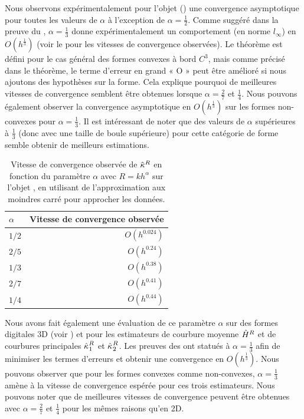 Nous observons expérimentalement pour l'objet \Ellipse
() une convergence asymptotique pour
toutes les valeurs de $\alpha$ à l'exception de $\alpha = \frac{1}{2}$. Comme
suggéré dans la preuve du , $\alpha =
\frac{1}{3}$ donne expérimentalement un comportement (en norme $l_\infty$) en
$O(h^\frac{1}{3})$ (voir le  pour les
vitesses de convergence observées). Le théorème est défini pour le cas général
des formes convexes à bord $C^3$, mais comme précisé dans le théorème, le terme
d'erreur en grand « O » peut être amélioré si nous ajoutons des hypothèses sur
la forme. Cela explique pourquoi de meilleures vitesses de convergence semblent
être obtenues lorsque $\alpha = \frac{2}{7}$ et $\frac{1}{4}$. Nous pouvons
également observer la convergence asymptotique en $O(h^\frac{1}{3})$ sur les
formes non-convexes pour $\alpha = \frac{1}{3}$. Il est intéressant de noter que
des valeurs de $\alpha$ supérieures à $\frac{1}{3}$ (donc avec une taille de
boule supérieure) pour cette catégorie de forme semble obtenir de meilleurs
estimations.
%
\begin{table}[ht]
\centering
%
\caption{Vitesse de convergence observée de $\hat{\kappa}^{R}$ en fonction du paramètre
$\alpha$ avec $R=kh^\alpha$ sur l'objet \Ellipse, en utilisant de
l'approximation aux moindres carré pour approcher les données.}
%
\label{tab:convergence-speed-alpha-2d}
\begin{tabular}{@{}lr@{}}
 $\alpha$ & Vitesse de convergence observée \\ \midrule
 $1/2$    & $O(h^{0.024})$                    \\
 $2/5$    & $O(h^{0.24})$                    \\
 $1/3$    & $O(h^{0.38})$                    \\
 $2/7$    & $O(h^{0.41})$                    \\
 $1/4$    & $O(h^{0.44})$                    \\ \bottomrule
\end{tabular}
\end{table}
%


Nous avons fait également une évaluation de ce paramètre $\alpha$ sur des formes
digitales 3D (voir ) \RoundedCube et
\Goursat pour les estimateurs de courbure moyenne $\hat{H}^{R}$ et de
courbures principales $\hat{\kappa_{}}_{1}^{R}$ et $\hat{\kappa_{}}_{2}^{R}$. Les preuves des
ont statués à $\alpha = \frac{1}{3}$ afin de minimiser les termes d'erreurs et
obtenir une convergence en $O(h^\frac{1}{3})$. Nous pouvons observer que pour les
formes convexes comme non-convexes, $\alpha = \frac{1}{3}$ amène à la vitesse de
convergence espérée pour ces trois estimateurs. Nous pouvons noter que de
meilleures vitesses de convergence peuvent être obtenues avec $\alpha =
\frac{2}{7}$ et $\frac{1}{4}$ pour les mêmes raisons qu'en 2D.


